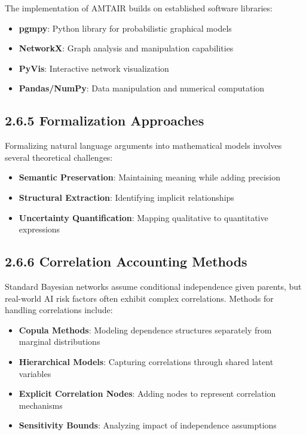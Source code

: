 \documentclass[
  11pt,
  letterpaper,
]{book}
\providecommand{\tightlist}{%
  \setlength{\itemsep}{0pt}\setlength{\parskip}{0pt}}
\begin{document}
The implementation of AMTAIR builds on established software libraries:

\begin{itemize}
\tightlist
\item
  \textbf{pgmpy}: Python library for probabilistic graphical models
\item
  \textbf{NetworkX}: Graph analysis and manipulation capabilities
\item
  \textbf{PyVis}: Interactive network visualization
\item
  \textbf{Pandas/NumPy}: Data manipulation and numerical computation
\end{itemize}

\subsection*{2.6.5 Formalization Approaches}\label{sec-formalization}

Formalizing natural language arguments into mathematical models involves
several theoretical challenges:

\begin{itemize}
\tightlist
\item
  \textbf{Semantic Preservation}: Maintaining meaning while adding
  precision
\item
  \textbf{Structural Extraction}: Identifying implicit relationships
\item
  \textbf{Uncertainty Quantification}: Mapping qualitative to
  quantitative expressions
\end{itemize}

\subsection*{2.6.6 Correlation Accounting
Methods}\label{sec-correlation-methods}

Standard Bayesian networks assume conditional independence given
parents, but real-world AI risk factors often exhibit complex
correlations. Methods for handling correlations include:

\begin{itemize}
\tightlist
\item
  \textbf{Copula Methods}: Modeling dependence structures separately
  from marginal distributions
\item
  \textbf{Hierarchical Models}: Capturing correlations through shared
  latent variables
\item
  \textbf{Explicit Correlation Nodes}: Adding nodes to represent
  correlation mechanisms
\item
  \textbf{Sensitivity Bounds}: Analyzing impact of independence
  assumptions
\end{itemize}
\end{document}
